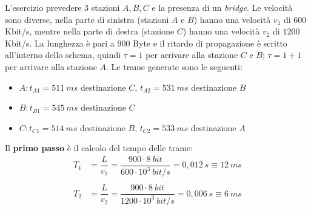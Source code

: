 \documentclass[a4paper]{article}
\begin{document}
	\noindent
	L'esercizio prevedere $3$ stazioni $A,B,C$ e la presenza di un \emph{bridge}. Le velocità sono diverse, nella parte di sinistra (stazioni $A$ e $B$) hanno una velocità $v_{1}$ di $600$ Kbit/s, mentre nella parte di destra (stazione $C$) hanno una velocità $v_{2}$ di $1200$ Kbit/s. La lunghezza è pari a $900$ Byte e il ritardo di propagazione è scritto all'interno dello schema, quindi $\tau = 1$ per arrivare alla stazione $C$ e $B$; $\tau = 1 + 1$ per arrivare alla stazione $A$. Le trame generate sono le seguenti:
	\begin{itemize}[label=-]
		\item $A: t_{A1} = 511 \: ms$ destinazione $C$, $t_{A2} = 531 \: ms$ destinazione $B$
		\item $B: t_{B1} = 545 \: ms$ destinazione $C$
		\item $C: t_{C1} = 514 \: ms$ destinazione $B$, $t_{C2} = 533 \: ms$ destinazione $A$
	\end{itemize}
	Il \textbf{primo passo} è il calcolo del tempo delle trame:
	\begin{equation*}
		\begin{array}{ll}
			T_{1} &= \dfrac{L}{v_{1}} = \dfrac{900 \cdot 8 \: bit}{600 \cdot 10^{3} \: bit/s} = 0,012 \: s \equiv 12 \: ms \\
			& \\
			T_{2} &= \dfrac{L}{v_{2}} = \dfrac{900 \cdot 8 \: bit}{1200 \cdot 10^{3} \: bit/s} = 0,006 \: s \equiv 6 \: ms
		\end{array}
	\end{equation*}\newpage
\end{document}
